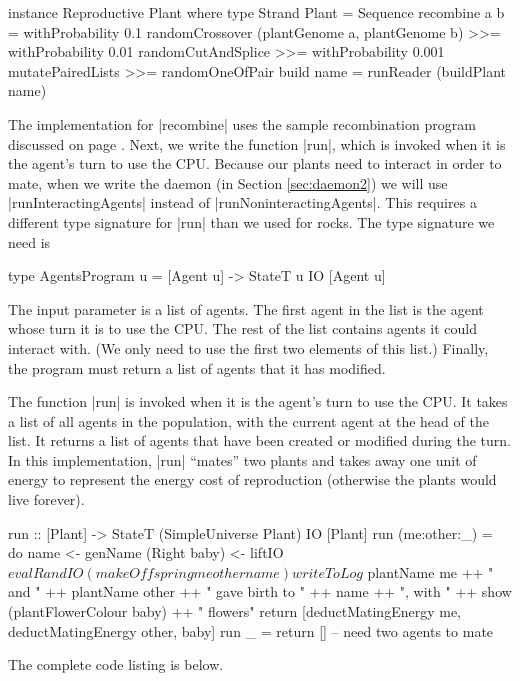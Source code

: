 \begin{code}
instance Reproductive Plant where
  type Strand Plant = Sequence
  recombine a b = 
    withProbability 0.1 randomCrossover (plantGenome a, plantGenome b) >>=
    withProbability 0.01 randomCutAndSplice >>=
    withProbability 0.001 mutatePairedLists >>=
    randomOneOfPair
  build name = runReader (buildPlant name)
\end{code} 

The implementation for |recombine| uses the sample recombination
program discussed on page \pageref{code:recombination}.
Next, we write the function |run|, 
which is invoked when it is the agent's turn to use the CPU.
Because our plants need to interact in order to mate,
when we write the daemon (in Section \ref{sec:daemon2}) we will use
|runInteractingAgents| instead of |runNoninteractingAgents|.
This requires a different type signature for |run| than we used for
rocks.
The type signature we need is

\begin{code}
type AgentsProgram u = [Agent u] -> StateT u IO [Agent u]
\end{code} 

The input parameter is a list of agents. 
The first agent in the list is the agent whose turn it is to use the 
CPU.
The rest of the list contains agents it could interact with.
(We only need to use the first two elements of this list.)
Finally, the program must return a list of agents that it has modified.

The function |run| is invoked when it is the agent's turn to use the CPU.
It takes a list of all agents in the population, with the current agent at the head of the list.
It returns a list of agents that have been created or modified during the turn.
In this implementation, |run| ``mates'' two plants and takes away one unit of energy 
to represent the energy cost of reproduction
(otherwise the plants would live forever).

\begin{code}
run :: [Plant] -> StateT (SimpleUniverse Plant) IO [Plant]
run (me:other:_) = do
  name <- genName
  (Right baby) <- liftIO $ evalRandIO (makeOffspring me other name)
  writeToLog $ 
    plantName me ++ " and " ++ plantName other ++
      " gave birth to " ++ name ++ ", with " ++ 
       show (plantFlowerColour baby) ++ " flowers"
  return [deductMatingEnergy me, deductMatingEnergy other, baby]
run _ = return [] -- need two agents to mate
\end{code}

The complete code listing is below.
\label{code:plant}

